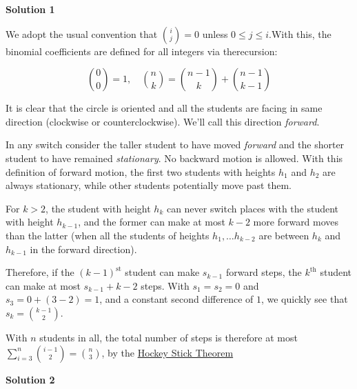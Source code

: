 \begin{enumerate}
 



\textbf{Solution 1}

We adopt the usual convention that $\binom{i}{j} = 0$ unless $0 \le j \le i$.With this, the binomial coefficients are defined for all integers via therecursion:

 
 \[\binom{0}{0} = 1, \quad \binom{n}{k} = \binom{n-1}{k} + \binom{n-1}{k-1}\]

 

 It is clear that the circle is oriented and all the students are facing in same direction (clockwise or counterclockwise). We'll call this direction \textit{forward}.

 In any switch consider the taller student to have moved \textit{forward} and the shorter student to have remained \textit{stationary}. No backward motion is allowed. With this definition of forward motion, the first two students with heights $h_1$ and $h_2$ are always stationary, while other students potentially move past them.

 For $k > 2$, the student with height $h_k$ can never switch places with the student with height $h_{k-1}$, and the former can make at most $k-2$ more forward moves than the latter (when all the students of heights $h_1, \ldots h_{k-2}$ are between $h_k$ and $h_{k-1}$ in the forward direction).

 Therefore, if the $(k-1)^{\mathrm{st}}$ student can make $s_{k-1}$ forward steps, the $k^{\mathrm{th}}$ student can make at most $s_{k-1} + k - 2$ steps. With $s_1 = s_2 = 0$ and $s_3 = 0 + (3-2) = 1$, and a constant second difference of $1$, we quickly see that $s_k = \binom{k-1}{2}$.

 With $n$ students in all, the total number of steps is therefore at most $\sum_{i=3}^{n}\binom{i-1}{2} = \binom{n}{3}$, by the \href{https://artofproblemsolving.com/wiki/index.php?title=Hockey\_Stick\_Theorem}{Hockey Stick Theorem}

 



\textbf{Solution 2}


\end{enumerate}
